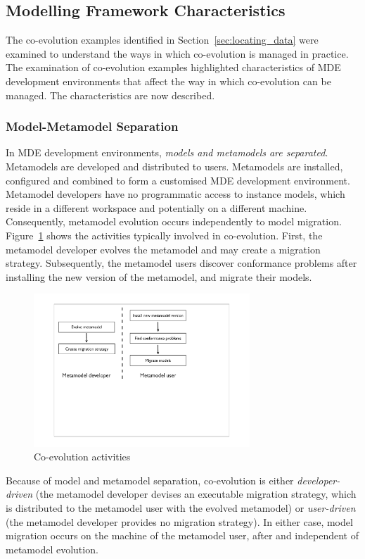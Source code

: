 \subsection{Modelling Framework Characteristics}
\label{subsec:modelling_framework_characteristics}
The co-evolution examples identified in Section~\ref{sec:locating_data} were examined to understand the ways in which co-evolution is managed in practice. The examination of co-evolution examples highlighted characteristics of MDE development environments that affect the way in which co-evolution can be managed. The characteristics are now described.

\subsubsection{Model-Metamodel Separation}
In MDE development environments, \emph{models and metamodels are separated}. Metamodels are developed and distributed to users. Metamodels are installed, configured and combined to form a customised MDE development environment. Metamodel developers have no programmatic access to instance models, which reside in a different workspace and potentially on a different machine. Consequently, metamodel evolution occurs independently to model migration. Figure~\ref{fig:co-evo_activities} shows the activities typically involved in co-evolution. First, the metamodel developer evolves the metamodel and may create a migration strategy. Subsequently, the metamodel users discover conformance problems after installing the new version of the metamodel, and migrate their models.

\begin{figure}[htbp]
	\centering
		\includegraphics*[viewport=80 250 600 550,height=5.75cm]{4.Analysis/images/co-evo_activities.pdf}
	\caption{Co-evolution activities}
	\label{fig:co-evo_activities}
\end{figure}

Because of model and metamodel separation, co-evolution is either \emph{developer-driven} (the metamodel developer devises an executable migration strategy, which is distributed to the metamodel user with the evolved metamodel) or \emph{user-driven} (the metamodel developer provides no migration strategy). In either case, model migration occurs on the machine of the metamodel user, after and independent of metamodel evolution.


